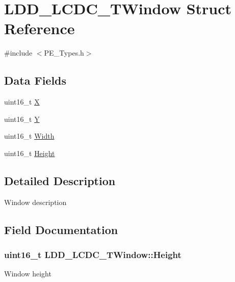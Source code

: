 \hypertarget{struct_l_d_d___l_c_d_c___t_window}{}\section{L\+D\+D\+\_\+\+L\+C\+D\+C\+\_\+\+T\+Window Struct Reference}
\label{struct_l_d_d___l_c_d_c___t_window}


{\ttfamily \#include $<$P\+E\+\_\+\+Types.\+h$>$}

\subsection*{Data Fields}
\begin{DoxyCompactItemize}
\item 
uint16\+\_\+t \hyperlink{struct_l_d_d___l_c_d_c___t_window_a9dd1270e9794b4dbd79b2b30afca87c9}{X}
\item 
uint16\+\_\+t \hyperlink{struct_l_d_d___l_c_d_c___t_window_af64f532d1fb5899c563ba40df90867d8}{Y}
\item 
uint16\+\_\+t \hyperlink{struct_l_d_d___l_c_d_c___t_window_a53ee53813f5884a400be8ca3093233c4}{Width}
\item 
uint16\+\_\+t \hyperlink{struct_l_d_d___l_c_d_c___t_window_abe1dbefb6d43373336fa414b88a79cc2}{Height}
\end{DoxyCompactItemize}


\subsection{Detailed Description}
Window description 

\subsection{Field Documentation}
\subsubsection[{\texorpdfstring{Height}{Height}}]{\setlength{\rightskip}{0pt plus 5cm}uint16\+\_\+t L\+D\+D\+\_\+\+L\+C\+D\+C\+\_\+\+T\+Window\+::\+Height}\hypertarget{struct_l_d_d___l_c_d_c___t_window_abe1dbefb6d43373336fa414b88a79cc2}{}\label{struct_l_d_d___l_c_d_c___t_window_abe1dbefb6d43373336fa414b88a79cc2}
Window height 
